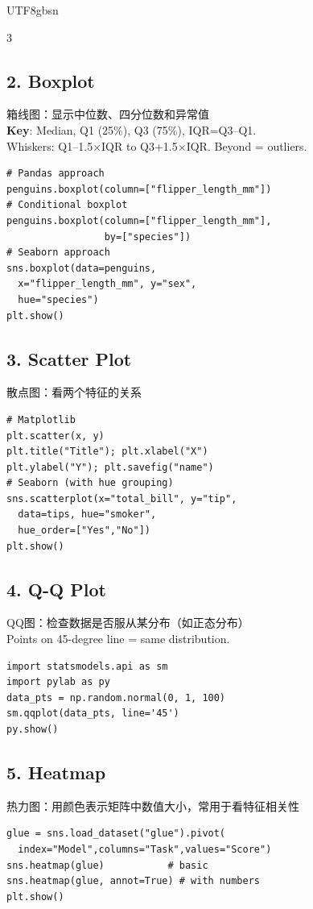 \documentclass[9pt,landscape,a4paper]{article}
\newcommand{\zhint}[1]{{\scriptsize\color{gray!70!black}#1}}
\begin{document}
\begin{CJK}{UTF8}{gbsn}
\begin{multicols}{3}
\subsection{2. Boxplot}
\zhint{箱线图：显示中位数、四分位数和异常值}\\
\textbf{Key}: Median, Q1 (25\%), Q3 (75\%), IQR=Q3--Q1.\\
Whiskers: Q1--1.5$\times$IQR to Q3+1.5$\times$IQR. Beyond = outliers.

\begin{lstlisting}
# Pandas approach
penguins.boxplot(column=["flipper_length_mm"])
# Conditional boxplot
penguins.boxplot(column=["flipper_length_mm"],
                 by=["species"])
# Seaborn approach
sns.boxplot(data=penguins,
  x="flipper_length_mm", y="sex",
  hue="species")
plt.show()
\end{lstlisting}

\subsection{3. Scatter Plot}
\zhint{散点图：看两个特征的关系}
\begin{lstlisting}
# Matplotlib
plt.scatter(x, y)
plt.title("Title"); plt.xlabel("X")
plt.ylabel("Y"); plt.savefig("name")
# Seaborn (with hue grouping)
sns.scatterplot(x="total_bill", y="tip",
  data=tips, hue="smoker",
  hue_order=["Yes","No"])
plt.show()
\end{lstlisting}

\subsection{4. Q-Q Plot}
\zhint{QQ图：检查数据是否服从某分布（如正态分布）}\\
Points on 45-degree line = same distribution.
\begin{lstlisting}
import statsmodels.api as sm
import pylab as py
data_pts = np.random.normal(0, 1, 100)
sm.qqplot(data_pts, line='45')
py.show()
\end{lstlisting}

\subsection{5. Heatmap}
\zhint{热力图：用颜色表示矩阵中数值大小，常用于看特征相关性}
\begin{lstlisting}
glue = sns.load_dataset("glue").pivot(
  index="Model",columns="Task",values="Score")
sns.heatmap(glue)           # basic
sns.heatmap(glue, annot=True) # with numbers
plt.show()
\end{lstlisting}


\end{multicols}
\end{CJK}
\end{document}
